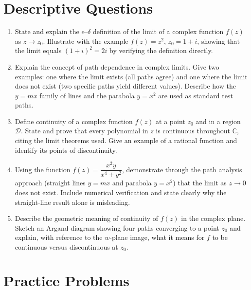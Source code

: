 \documentclass[12pt,a4paper]{article}
\begin{document}
\section{Descriptive Questions}

\begin{enumerate}[leftmargin=*, label=\textbf{D\arabic*.}]

\item State and explain the $\epsilon$--$\delta$ definition of the limit of a complex
function $f(z)$ as $z \to z_0$.  Illustrate with the example $f(z) = z^2$, $z_0 = 1+i$,
showing that the limit equals $(1+i)^2 = 2i$ by verifying the definition directly.

\item Explain the concept of path dependence in complex limits.  Give two examples:
one where the limit exists (all paths agree) and one where the limit does not exist
(two specific paths yield different values).  Describe how the $y = mx$ family of
lines and the parabola $y = x^2$ are used as standard test paths.

\item Define continuity of a complex function $f(z)$ at a point $z_0$ and in a region
$\mathcal{D}$.  State and prove that every polynomial in $z$ is continuous throughout
$\mathbb{C}$, citing the limit theorems used.  Give an example of a rational function
and identify its points of discontinuity.

\item Using the function $f(z) = \dfrac{x^2 y}{x^4 + y^2}$, demonstrate through the
path analysis approach (straight lines $y = mx$ and parabola $y = x^2$) that the limit
as $z \to 0$ does not exist.  Include numerical verification and state clearly why the
straight-line result alone is misleading.

\item Describe the geometric meaning of continuity of $f(z)$ in the complex plane.
Sketch an Argand diagram showing four paths converging to a point $z_0$ and explain,
with reference to the $w$-plane image, what it means for $f$ to be continuous versus
discontinuous at $z_0$.

\end{enumerate}

\section{Practice Problems}
\end{document}
